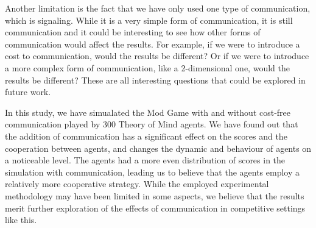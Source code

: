 Another limitation is the fact that we have only used one type of communication, which is signaling. While it is a very simple form of communication, it is still communication and it could be interesting to see how other forms of communication would affect the results. For example, if we were to introduce a cost to communication, would the results be different? Or if we were to introduce a more complex form of communication, like a 2-dimensional one, would the results be different? These are all interesting questions that could be explored in future work.

In this study, we have simualated the Mod Game with and without cost-free communication played by 300 Theory of Mind agents. We have found out that the addition of communication has a significant effect on the scores and the cooperation between agents, and changes the dynamic and behaviour of agents on a noticeable level. The agents had a more even distribution of scores in the simulation with communication, leading us to believe that the agents employ a relatively more cooperative strategy. While the employed experimental methodology may have been limited in some aspects, we believe that the results merit further exploration of the effects of communication in competitive settings like this.
